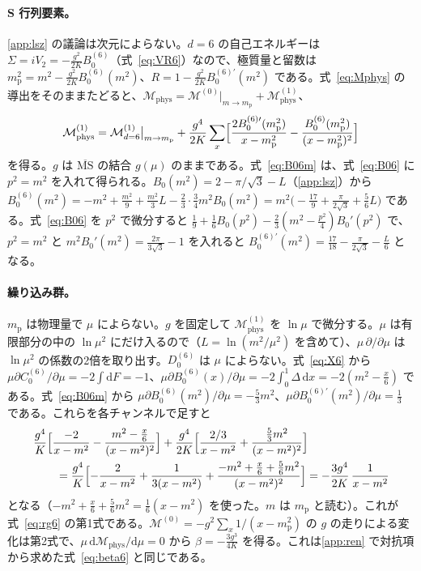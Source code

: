 \documentclass[a4paper,10pt]{ltjsarticle}
\newcommand{\dd}{\mathrm{d}}
\begin{document}
\paragraph{S 行列要素。}\ref{app:lsz} の議論は次元によらない。$d=6$ の自己エネルギーは $\Sigma=iV_2=-\frac{g^2}{2K}B_0^{(6)}$（式~\eqref{eq:VR6}）なので、極質量と留数は $m_{\mathrm p}^2=m^2-\frac{g^2}{2K}B_0^{(6)}(m^2)$、$R=1-\frac{g^2}{2K}B_0^{(6)\prime}(m^2)$ である。式~\eqref{eq:Mphys} の導出をそのままたどると、$\mathcal{M}_{\mathrm{phys}}=\mathcal{M}^{(0)}|_{m\to m_{\mathrm p}}+\mathcal{M}^{(1)}_{\mathrm{phys}}$、
\begin{equation*}
\mathcal{M}^{(1)}_{\mathrm{phys}}=\mathcal{M}^{(1)}_{d=6}\big|_{m\to m_{\mathrm p}}+\frac{g^4}{2K}\sum_x\Bigl[\frac{2B_0^{(6)\prime}(m_{\mathrm p}^2)}{x-m_{\mathrm p}^2}-\frac{B_0^{(6)}(m_{\mathrm p}^2)}{(x-m_{\mathrm p}^2)^2}\Bigr]
\end{equation*}
を得る。$g$ は $\overline{\mathrm{MS}}$ の結合 $g(\mu)$ のままである。式~\eqref{eq:B06m} は、式~\eqref{eq:B06} に $p^2=m^2$ を入れて得られる。$B_0(m^2)=2-\pi/\sqrt3-L$（\ref{app:lsz}）から $B_0^{(6)}(m^2)=-m^2+\frac{m^2}9+\frac{m^2}3L-\frac23\cdot\frac34m^2B_0(m^2)=m^2\bigl(-\frac{17}9+\frac{\pi}{2\sqrt3}+\frac56L\bigr)$ である。式~\eqref{eq:B06} を $p^2$ で微分すると $\frac19+\frac16B_0(p^2)-\frac23(m^2-\frac{p^2}4)B_0'(p^2)$ で、$p^2=m^2$ と $m^2B_0'(m^2)=\frac{2\pi}{3\sqrt3}-1$ を入れると $B_0^{(6)\prime}(m^2)=\frac{17}{18}-\frac{\pi}{2\sqrt3}-\frac L6$ となる。

\paragraph{繰り込み群。}$m_{\mathrm p}$ は物理量で $\mu$ によらない。$g$ を固定して $\mathcal{M}^{(1)}_{\mathrm{phys}}$ を $\ln\mu$ で微分する。$\mu$ は有限部分の中の $\ln\mu^2$ にだけ入るので（$L=\ln(m^2/\mu^2)$ を含めて）、$\mu\,\partial/\partial\mu$ は $\ln\mu^2$ の係数の2倍を取り出す。$D_0^{(6)}$ は $\mu$ によらない。式~\eqref{eq:X6} から $\mu\partial C_0^{(6)}/\partial\mu=-2\int\dd F=-1$、$\mu\partial B_0^{(6)}(x)/\partial\mu=-2\int_0^1\Delta\,\dd x=-2(m^2-\frac x6)$ である。式~\eqref{eq:B06m} から $\mu\partial B_0^{(6)}(m^2)/\partial\mu=-\frac53m^2$、$\mu\partial B_0^{(6)\prime}(m^2)/\partial\mu=\frac13$ である。これらを各チャンネルで足すと
\begin{align*}
&\frac{g^4}{K}\Bigl[\frac{-2}{x-m^2}-\frac{m^2-\frac x6}{(x-m^2)^2}\Bigr]+\frac{g^4}{2K}\Bigl[\frac{2/3}{x-m^2}+\frac{\frac53m^2}{(x-m^2)^2}\Bigr]\\
&\qquad=\frac{g^4}{K}\Bigl[-\frac{2}{x-m^2}+\frac{1}{3(x-m^2)}+\frac{-m^2+\frac x6+\frac56m^2}{(x-m^2)^2}\Bigr]=-\frac{3g^4}{2K}\,\frac{1}{x-m^2}
\end{align*}
となる（$-m^2+\frac x6+\frac56m^2=\frac16(x-m^2)$ を使った。$m$ は $m_{\mathrm p}$ と読む）。これが式~\eqref{eq:rg6} の第1式である。$\mathcal{M}^{(0)}=-g^2\sum_x1/(x-m_{\mathrm p}^2)$ の $g$ の走りによる変化は第2式で、$\mu\,\dd\mathcal{M}_{\mathrm{phys}}/\dd\mu=0$ から $\beta=-\frac{3g^3}{4K}$ を得る。これは\ref{app:ren} で対抗項から求めた式~\eqref{eq:beta6} と同じである。
\end{document}
